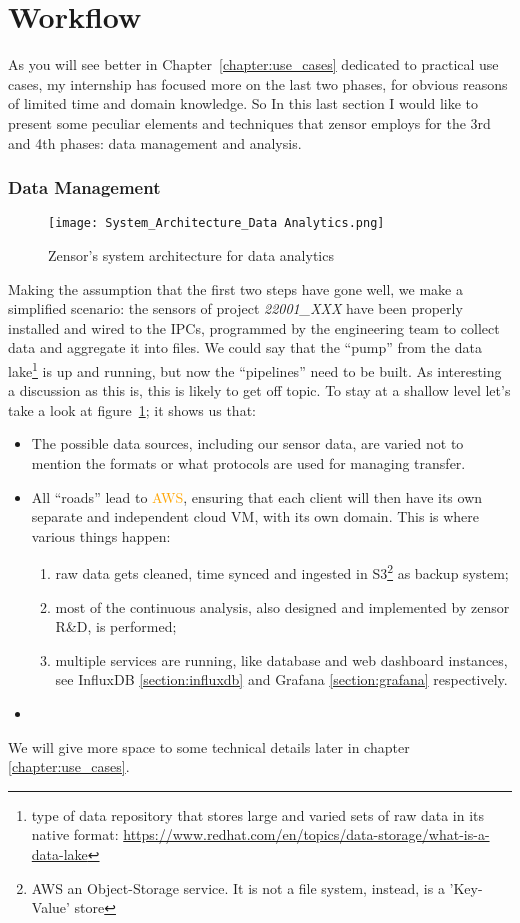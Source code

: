 \section{Workflow}
As you will see better in Chapter~\ref{chapter:use_cases} dedicated to practical use cases, my internship has focused more on the last two phases, for obvious reasons of limited time and domain knowledge.
So In this last section I would like to present some peculiar elements and techniques that zensor employs for the 3rd and 4th phases: data management and analysis.

\subsubsection{Data Management}
\begin{figure}[ht]
    \centering
    \texttt{[image: System\_Architecture\_Data Analytics.png]}
    \caption{Zensor's system architecture for data analytics}
    \label{fig:zensor_sys_architecture}
\end{figure}
Making the assumption that the first two steps have gone well, we make a simplified scenario: the sensors of project \textit{22001\_XXX} have been properly installed and wired to the IPCs, programmed by the engineering team to collect data and aggregate it into files. 
We could say that the ``pump'' from the data lake\footnote{type of data repository that stores large and varied sets of raw data in its native format: \url{https://www.redhat.com/en/topics/data-storage/what-is-a-data-lake}} is up and running, but now the ``pipelines'' 
need to be built. As interesting a discussion as this is, this is likely to get off topic. To stay at a shallow level let's take a look at figure~\ref{fig:zensor_sys_architecture}; it shows us that:
\begin{itemize}
	\item The possible data sources, including our sensor data, are varied not to mention the formats or what protocols are used for managing transfer. 
	\item All ``roads'' lead to \textcolor{orange}{\ac{AWS}}, ensuring that each client will then have its own separate and independent cloud VM, with its own domain.
		This is where various things happen:\begin{enumerate}
		\item raw data gets cleaned, time synced and ingested in \ac{S3}\footnote{AWS an Object-Storage service. It is not a file system, instead, is a 'Key-Value' store} as backup system;
		\item most of the continuous analysis, also designed and implemented by zensor R\&D, is performed;
		\item multiple services are running, like database and web dashboard instances, see InfluxDB \ref{section:influxdb} and Grafana \ref{section:grafana} respectively.
	\end{enumerate} 
	\item {}
\end{itemize}
We will give more space to some technical details later in chapter \ref{chapter:use_cases}. 

